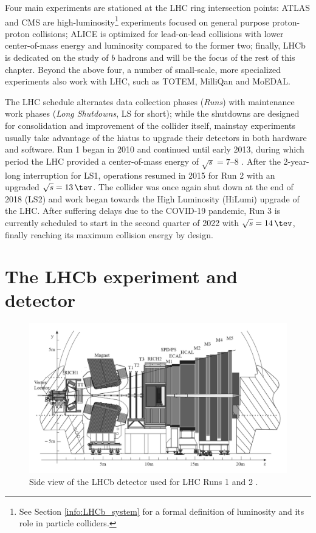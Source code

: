 Four main experiments are stationed at the LHC ring intersection points:
ATLAS and CMS are high-luminosity\footnote{See Section \ref{info:LHCb_system} for a formal definition of luminosity and its role in particle colliders.} experiments focused on general purpose proton-proton collisions; ALICE is optimized for lead-on-lead collisions with lower center-of-mass energy and luminosity compared to the former two; finally, LHCb is dedicated on the study of $b$ hadrons and will be the focus of the rest of this chapter.
Beyond the above four, a number of small-scale, more specialized experiments also work with LHC, such as TOTEM, MilliQan and MoEDAL.

The LHC schedule alternates data collection phases (\textit{Runs}) with maintenance work phases (\textit{Long Shutdowns}, LS for short);
while the shutdowns are designed for consolidation and improvement of the collider itself, mainstay experiments usually take advantage of the hiatus to upgrade their detectors in both hardware and software.
Run 1 began in 2010 and continued until early 2013, during which period the LHC provided a center-of-mass energy of $\sqrt{s} = 7$--$8$ \si{\tev}.
After the 2-year-long interruption for LS1, operations resumed in 2015 for Run 2 with an upgraded $\sqrt{s} = \SI{13}{\tev}$.
The collider was once again shut down at the end of 2018 (LS2) and work began towards the High Luminosity (HiLumi) upgrade of the LHC.
After suffering delays due to the COVID-19 pandemic, Run 3 is currently scheduled to start in the second quarter of 2022 with $\sqrt{s} = \SI{14}{\tev}$, finally reaching its maximum collision energy by design.


\section{The LHCb experiment and detector}
\label{sec:2:lhcb_detector}

\begin{figure}[t]
	\centering
	\includegraphics[width=\textwidth]{graphics/02-lhcb/lhcb_diagram.png}
	\caption[LHCb detector side view (Runs 1 and 2).]{Side view of the LHCb detector used for LHC Runs 1 and 2 \cite{Antunes-Nobrega:630827}.}
	\label{fig:2:lhcb_diagram}
\end{figure}

